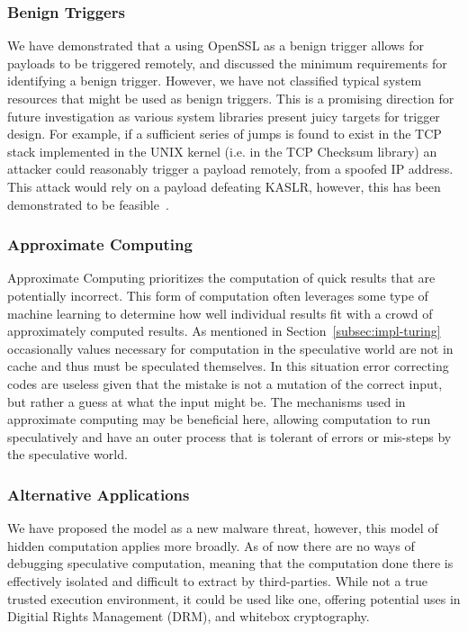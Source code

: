 \subsubsection{Benign Triggers}
We have demonstrated that a using \allowbreak OpenSSL as a benign trigger allows for
\speculake payloads to be triggered remotely, and discussed the minimum
requirements for identifying a benign trigger. However, we have not classified
typical system resources that might be used as benign triggers. This is a
promising direction for future investigation as various system libraries present
juicy targets for trigger design. For example, if a sufficient series of jumps
is found to exist in the TCP stack implemented in the UNIX kernel (i.e. in the
TCP Checksum library) an attacker could reasonably trigger a \speculake payload
remotely, from a spoofed IP address. This attack would rely on a payload
defeating KASLR, however, this has been demonstrated to be
feasible~\cite{gruss2017kaslr,evtyushkin2016jump}.

\subsubsection{Approximate Computing}
Approximate Computing prioritizes the computation of quick results that are
potentially incorrect. This form of computation often leverages some type of
machine learning to determine how well individual results fit with a crowd of
approximately computed results. As mentioned in Section~\ref{subsec:impl-turing}
occasionally values necessary for computation in the speculative world are not
in cache and thus must be speculated themselves. In this situation error
correcting codes are useless given that the mistake is not a mutation of the
correct input, but rather a guess at what the input might be. The mechanisms
used in approximate computing may be beneficial here, allowing computation to
run speculatively and have an outer process that is tolerant of errors or
mis-steps by the speculative world.



\subsubsection{Alternative Applications}
We have proposed the \speculake model as a new malware threat, however, this
model of hidden computation applies more broadly. As of now there are no ways of
debugging speculative computation, meaning that the computation done there is
effectively isolated and difficult to extract by third-parties. While not a true
trusted execution environment, it could be used like one, offering potential
uses in Digitial Rights Management (DRM), and whitebox cryptography.



